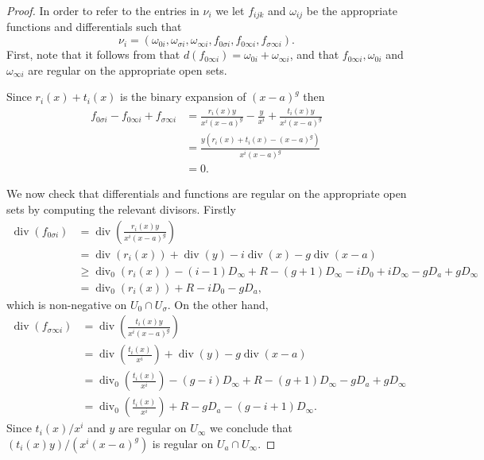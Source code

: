 \documentclass[draft, 11pt]{article} %
\theoremstyle{plain}
\theoremstyle{remark}
\DeclareMathOperator{\di}{div}
\begin{document}
\begin{proof}
In order to refer to the entries in $\nu_i$ we let $f_{ijk}$ and $\omega_{ij}$ be the appropriate functions and differentials such that
\[
\nu_i = \left( \omega_{0 i}, \omega_{\sigma i}, \omega_{\infty i}, f_{0 \sigma i}, f_{0 \infty i}, f_{\sigma \infty i} \right).
\]
First, note that it follows from \cite{derhamactions} that $d(f_{0 \infty i}) = \omega_{0 i} + \omega_{\infty i}$, and that $f_{0 \infty i}, \omega_{0 i}$ and $\omega_{\infty i}$ are regular on the appropriate open sets.

Since $r_i(x)+t_i(x)$ is the binary expansion of $(x-a)^g$ then
\begin{align*}
f_{0 \sigma i} - f_{0 \infty i}+ f_{\sigma \infty i} & = \frac{r_i(x)y}{x^i(x-a)^g} - \frac{y}{x^i} + \frac{t_i(x)y}{x^i(x-a)^g} \\
& = \frac{y(r_i(x) + t_i(x) - (x-a)^g)}{x^i(x-a)^g} \\
& = 0.
\end{align*}



We now check that differentials and functions are regular on the appropriate open sets by computing the relevant divisors.
Firstly
\begin{align*}
\di \left( f_{0 \sigma i} \right) & = \di \left( \frac{r_i(x)y}{x^i(x-a)^g} \right) \\
&  = \di(r_i(x)) + \di(y) - i\di(x) - g\di(x-a) \\
& \geq \di_0(r_i(x)) - (i-1)D_\infty +R - (g+1)D_\infty - iD_0 + iD_\infty - gD_a + gD_\infty \\
& = \di_0(r_i(x)) +R -iD_0 - gD_a,
\end{align*}
which is non-negative on $U_0 \cap U_\sigma$.
On the other hand,
\begin{align*}
\di \left( f_{\sigma \infty i} \right) & = \di \left( \frac{t_i(x)y}{x^i(x-a)^g} \right) \\
& = \di\left(\frac{t_i(x)}{x^i}\right) + \di(y) - g\di(x-a) \\
& = \di_0 \left( \frac{t_i(x)}{x^i} \right) - (g-i)D_\infty +R - (g+1)D_\infty - gD_a + gD_\infty\\
& = \di_0 \left( \frac{t_i(x)}{x^i} \right) +R - gD_a -(g-i+1)D_\infty.
\end{align*}
Since $t_i(x)/x^i$ and $y$ are regular on $U_\infty$ we conclude that $({t_i(x)y})/({x^i(x-a)^g})$ is regular on $U_a \cap U_\infty$.


\end{proof}
\end{document}
